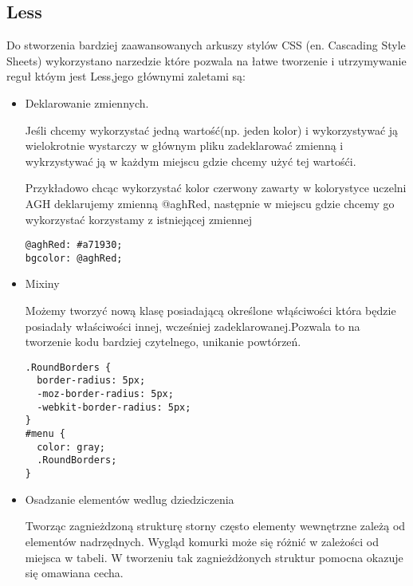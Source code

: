 \subsection{Less}
\label{sec:less}

Do stworzenia bardziej zaawansowanych arkuszy stylów CSS (en. Cascading Style Sheets) wykorzystano narzedzie które pozwala na łatwe tworzenie i utrzymywanie reguł któym jest Less,jego głównymi zaletami są:

\begin{itemize}
\item
Deklarowanie zmiennych.

Jeśli chcemy wykorzystać jedną wartość(np. jeden kolor) i wykorzystywać ją wielokrotnie wystarczy w głównym pliku zadeklarować zmienną i wykrzystywać ją w każdym miejscu gdzie chcemy użyć tej wartośći.

Przykładowo chcąc wykorzystać kolor czerwony zawarty w kolorystyce uczelni AGH deklarujemy zmienną @aghRed, następnie w miejscu gdzie chcemy go wykorzystać korzystamy z istniejącej zmiennej

\lstset{language=JavaScript}
\label{lis:webSql}
\begin{lstlisting}[caption=json]
@aghRed: #a71930;
bgcolor: @aghRed;
\end{lstlisting}

\item
Mixiny

Możemy tworzyć nową klasę posiadającą określone włąściwości która będzie posiadały właściwości innej, wcześniej zadeklarowanej.Pozwala to na tworzenie kodu bardziej czytelnego, unikanie powtórzeń.


\lstset{language=JavaScript}
\label{lis:webSql}
\begin{lstlisting}[caption=json]
.RoundBorders {
  border-radius: 5px;
  -moz-border-radius: 5px;
  -webkit-border-radius: 5px;
}
#menu {
  color: gray;
  .RoundBorders;
}
\end{lstlisting}

\item
Osadzanie elementów wedlug dziedziczenia

Tworząc zagnieżdzoną strukturę storny często elementy wewnętrzne zależą od elementów nadrzędnych. Wygląd komurki może się różnić w zależości od miejsca w tabeli. W tworzeniu tak zagnieżdżonych struktur pomocna okazuje się omawiana cecha.

\end{itemize}
